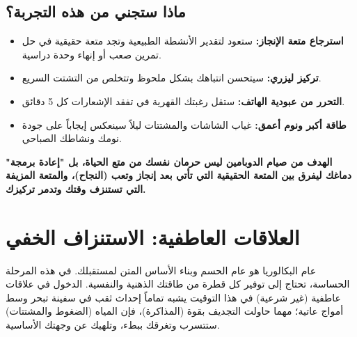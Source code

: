 \documentclass[12pt,a4paper]{book}
\newcommand{\importantAr}[1]{%
	\begin{important}
		\bfseries #1
	\end{important}
}
\begin{document}
	\subsection{ماذا ستجني من هذه التجربة؟}
	\begin{itemize}
		\item \textbf{استرجاع متعة الإنجاز:} ستعود لتقدير الأنشطة الطبيعية وتجد متعة حقيقية في حل تمرين صعب أو إنهاء وحدة دراسية.
		\item \textbf{تركيز ليزري:} سيتحسن انتباهك بشكل ملحوظ وتتخلص من التشتت السريع.
		\item \textbf{التحرر من عبودية الهاتف:} ستقل رغبتك القهرية في تفقد الإشعارات كل 5 دقائق.
		\item \textbf{طاقة أكبر ونوم أعمق:} غياب الشاشات والمشتتات ليلاً سينعكس إيجاباً على جودة نومك ونشاطك الصباحي.
	\end{itemize}
	
	\importantAr{الهدف من صيام الدوبامين ليس حرمان نفسك من متع الحياة، بل "إعادة برمجة" دماغك ليفرق بين المتعة الحقيقية التي تأتي بعد إنجاز وتعب (النجاح)، والمتعة المزيفة التي تستنزف وقتك وتدمر تركيزك.}
	
	\section{العلاقات العاطفية: الاستنزاف الخفي }
	
	عام البكالوريا هو عام الحسم وبناء الأساس المتن لمستقبلك. في هذه المرحلة الحساسة، تحتاج إلى توفير كل قطرة من طاقتك الذهنية والنفسية. الدخول في علاقات عاطفية (غير شرعية) في هذا التوقيت يشبه تماماً إحداث ثقب في سفينة تبحر وسط أمواج عاتية؛ مهما حاولت التجديف بقوة (المذاكرة)، فإن المياه (الضغوط والمشتتات) ستتسرب وتغرقك ببطء، وتلهيك عن وجهتك الأساسية.
	

	
\end{document}
